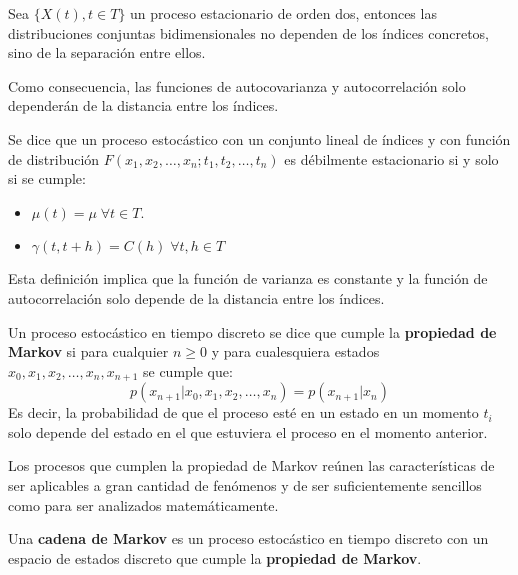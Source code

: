 \begin{teorema}
Sea $\{X(t), t\in T\}$ un proceso estacionario de orden dos, entonces las distribuciones conjuntas bidimensionales no dependen de los \'indices concretos, sino de la separaci\'on entre ellos.
\end{teorema}

Como consecuencia, las funciones de autocovarianza y autocorrelaci\'on solo depender\'an de la distancia entre los \'indices.

\begin{definicion}
Se dice que un proceso estoc\'astico con un conjunto lineal de \'indices y con funci\'on de distribuci\'on $F(x_1,x_2,\ldots,x_n;t_1,t_2,\ldots,t_n)$ es d\'ebilmente estacionario si y solo si se cumple:
\begin{itemize}
\item $\mu(t)=\mu\;\forall t\in T$.
\item $\gamma(t,t+h)=C(h)\;\forall t,h\in T$
\end{itemize}
\end{definicion}

Esta definici\'on implica que la funci\'on de varianza es constante y la funci\'on de autocorrelaci\'on solo depende de la distancia entre los \'indices.


\begin{definicion}
Un proceso estoc\'astico en tiempo discreto se dice que cumple la \textbf{propiedad de Markov} si para cualquier $n\ge 0$ y para cualesquiera estados $x_0,x_1,x_2,\ldots,x_n,x_{n+1}$ se cumple que:
\begin{equation*}
p(x_{n+1}|x_0,x_1,x_2,\ldots,x_n)=p(x_{n+1}|x_n)
\end{equation*}
Es decir, la probabilidad de que el proceso est\'e en un estado en un momento $t_i$ solo depende del estado en el que estuviera el proceso en el momento anterior.
\end{definicion}

Los procesos que cumplen la propiedad de Markov re\'unen las caracter\'isticas de ser aplicables a gran cantidad de fen\'omenos y de ser suficientemente sencillos como para ser analizados matem\'aticamente.

\begin{definicion}
Una \textbf{cadena de Markov} es un proceso estoc\'astico en tiempo discreto con un espacio de estados discreto  que cumple la \textbf{propiedad de Markov}.
\end{definicion}

